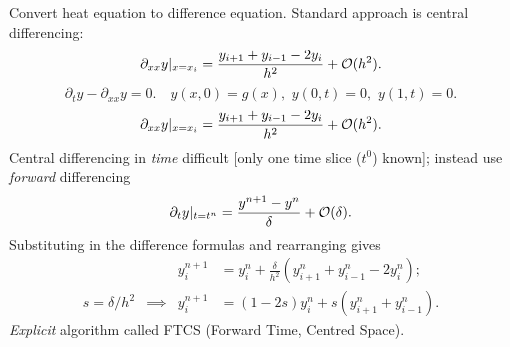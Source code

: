 \documentclass{beamer}
\begin{document}
\begin{frame}
\begin{overlayarea}{\textwidth}{0.8\textheight}
{      Convert heat equation to difference equation.
      Standard approach is central differencing:
      \begin{equation*}
        \partial_{x x} y |_{x = x_i} = \frac{ y_{i+1} + y_{i-1} - 2
          y_i}{h^2} + {\cal O}(h^2).
      \end{equation*}
    }
    {
      \begin{equation*}
        \partial_{t} y - \partial_{x x} y = 0. \quad y(x, 0) = g(x),
        \,\, y(0, t) = 0, \,\, y(1, t) = 0.
      \end{equation*}
      \begin{equation*}
        \partial_{x x} y |_{x = x_i} = \frac{ y_{i+1} + y_{i-1} - 2
          y_i}{h^2} + {\cal O}(h^2).
      \end{equation*}
      Central differencing in \emph{time} difficult [only one time
      slice ($t^0$) known]; instead use \emph{forward} differencing
      \begin{equation*}
        \partial_t y |_{t = t^n} = \frac{y^{n+1} - y^n}{\delta} + {\cal
          O}(\delta).
      \end{equation*}
    }
    {
      Substituting in the difference formulas and rearranging gives
      \begin{align*}
        && y_i^{n+1} & = y_i^n + \frac{\delta}{h^2} \left( y_{i+1}^n +
          y_{i-1}^n - 2 y_i^n \right); \\
        s = \delta / h^2 & \implies &
        y_i^{n+1} &= ( 1 - 2 s ) y_i^n + s \left( y_{i+1}^n +
          y_{i-1}^n \right).
      \end{align*}
    }
    {
      \emph{Explicit} algorithm called FTCS (Forward Time,
      Centred Space).
    }
  \end{overlayarea}

\end{frame}
\end{document}
